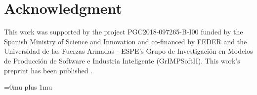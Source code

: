 \documentclass{cta-author}%
\begin{document}
\begin{comment}

\vskip2pc

\noindent The output for table is:

\begin{table}[!h]
\caption{An Example of a Table}%
\label{table_example}
\centering
\begin{tabular}{|c||c|}%
\hline
One & Two\\ %
\hline
Three & Four\\%
\hline
\end{tabular}
\end{table}%

\section{Conclusion}
The conclusion text goes here.
\end{comment}


\section*{Acknowledgment}
This work was supported by the project PGC2018-097265-B-I00 funded by the Spanish Ministry of Science and Innovation and co-financed by FEDER and the Universidad de las Fuerzas Armadas  - ESPE's Grupo de Investigación en Modelos de Producción de Software e Industria Inteligente (GrIMPSoftII). This work's preprint has been published \cite{Fonseca-2023-experimentation-proccess-SE-unpublished}.


\Urlmuskip=0mu plus 1mu\relax


%
\end{document}
